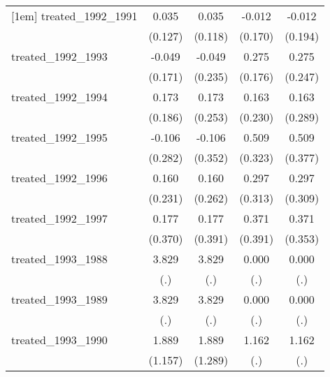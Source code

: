 {\begin{tabular}{l*{4}{c}}
[1em]
treated\_1992\_1991&       0.035         &       0.035         &      -0.012         &      -0.012         \\
            &     (0.127)         &     (0.118)         &     (0.170)         &     (0.194)         \\
[1em]
treated\_1992\_1993&      -0.049         &      -0.049         &       0.275         &       0.275         \\
            &     (0.171)         &     (0.235)         &     (0.176)         &     (0.247)         \\
[1em]
treated\_1992\_1994&       0.173         &       0.173         &       0.163         &       0.163         \\
            &     (0.186)         &     (0.253)         &     (0.230)         &     (0.289)         \\
[1em]
treated\_1992\_1995&      -0.106         &      -0.106         &       0.509         &       0.509         \\
            &     (0.282)         &     (0.352)         &     (0.323)         &     (0.377)         \\
[1em]
treated\_1992\_1996&       0.160         &       0.160         &       0.297         &       0.297         \\
            &     (0.231)         &     (0.262)         &     (0.313)         &     (0.309)         \\
[1em]
treated\_1992\_1997&       0.177         &       0.177         &       0.371         &       0.371         \\
            &     (0.370)         &     (0.391)         &     (0.391)         &     (0.353)         \\
[1em]
treated\_1993\_1988&       3.829         &       3.829         &       0.000         &       0.000         \\
            &         (.)         &         (.)         &         (.)         &         (.)         \\
[1em]
treated\_1993\_1989&       3.829         &       3.829         &       0.000         &       0.000         \\
            &         (.)         &         (.)         &         (.)         &         (.)         \\
[1em]
treated\_1993\_1990&       1.889         &       1.889         &       1.162         &       1.162         \\
            &     (1.157)         &     (1.289)         &         (.)         &         (.)         \\

\end{tabular}}

